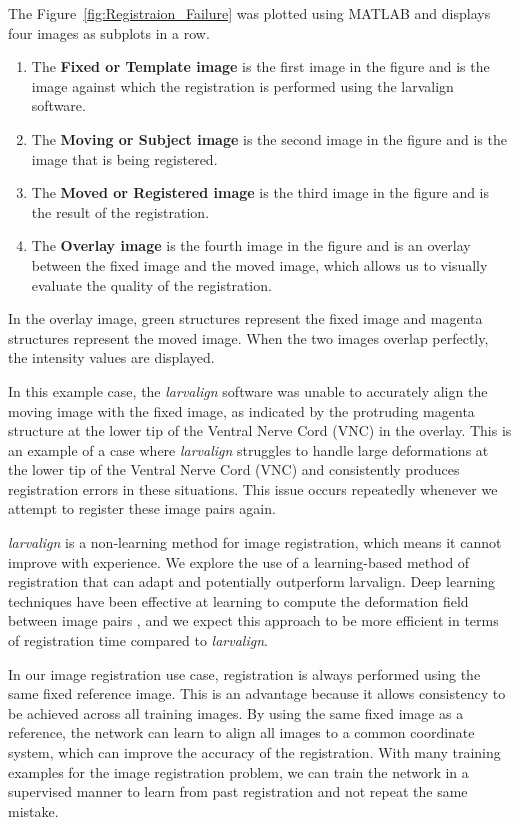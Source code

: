 \documentclass{book}
\begin{document}
	The Figure~\ref{fig:Registraion_Failure} was plotted using MATLAB and displays four images as subplots in a row. 
	\begin{enumerate}
		\item The \textbf{Fixed or Template image} is the first image in the figure and is the image against which the registration is performed using the larvalign software.
		\item The \textbf{Moving or Subject image} is the second image in the figure and is the image that is being registered.
		\item The \textbf{Moved or Registered image} is the third image in the figure and is the result of the registration.
		\item The \textbf{Overlay image} is the fourth image in the figure and is an overlay between the fixed image and the moved image, which allows us to visually evaluate the quality of the registration.
	\end{enumerate}
	
	In the overlay image, green structures represent the fixed image and magenta structures represent the moved image. When the two images overlap perfectly, the intensity values are displayed.
	
	In this example case, the \textit{larvalign} software was unable to accurately align the moving image with the fixed image, as indicated by the protruding magenta structure at the lower tip of the Ventral Nerve Cord (VNC) in the overlay. This is an example of a case where \textit{larvalign} struggles to handle large deformations at the lower tip of the Ventral Nerve Cord (VNC) and consistently produces registration errors in these situations. This issue occurs repeatedly whenever we attempt to register these image pairs again.
	
	\textit{larvalign} is a non-learning method for image registration, which means it cannot improve with experience. We explore the use of a learning-based method of registration that can adapt and potentially outperform larvalign. Deep learning techniques have been effective at learning to compute the deformation field between image pairs \cite{Balakrishnan_2019, de_Vos_2019, Wu, Fu_2020, 10.1007/978-3-319-66182-7_27}, and we expect this approach to be more efficient in terms of registration time compared to \textit{larvalign}.
	
	In our image registration use case, registration is always performed using the same fixed reference image. This is an advantage because it allows consistency to be achieved across all training images. By using the same fixed image as a reference, the network can learn to align all images to a common coordinate system, which can improve the accuracy of the registration. With many training examples for the image registration problem, we can train the network in a supervised manner to learn from past registration and not repeat the same mistake.
	
\end{document}
